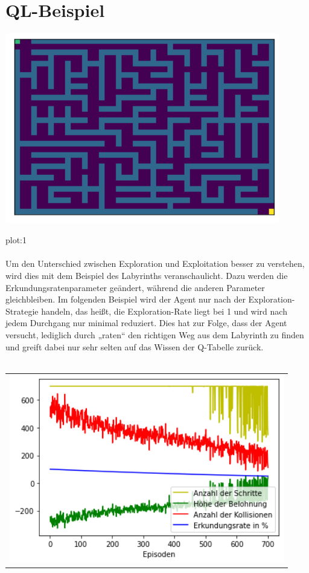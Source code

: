 \documentclass[12pt,titlepage]{article}
\begin{document}
\section{QL-Beispiel}
\includegraphics[width=12cm]{Laby.png}

plot:1\\\\
Um den Unterschied zwischen Exploration und Exploitation besser zu verstehen, wird dies mit dem Beispiel des Labyrinths veranschaulicht. Dazu werden die Erkundungsratenparameter geändert, während die anderen Parameter gleichbleiben.
Im folgenden Beispiel wird der Agent nur nach der Exploration-Strategie handeln, das heißt, die Exploration-Rate liegt bei 1 und wird nach jedem Durchgang nur minimal reduziert. Dies hat zur Folge, dass der Agent versucht, lediglich durch „raten“ den richtigen Weg aus dem Labyrinth zu finden und greift dabei nur sehr selten auf das Wissen der Q-Tabelle zurück.
\\\\
\begin{tabular}{c}
\includegraphics[width=12cm]{QL_Laby_1.png}
\end{tabular}
\end{document}
